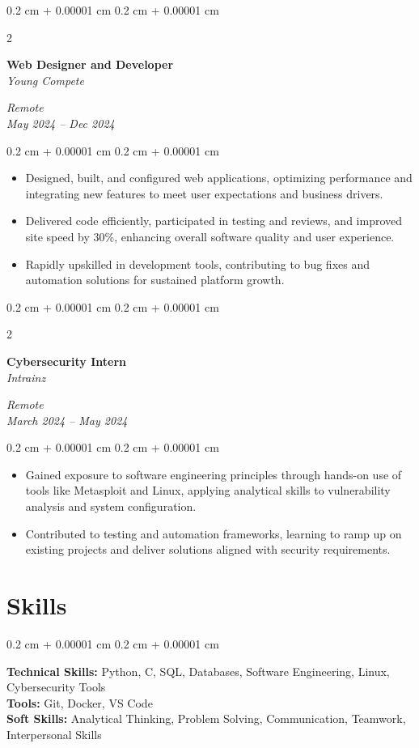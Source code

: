 \documentclass[10pt, letterpaper]{article}
\newenvironment{highlights}{
    \begin{itemize}[
        topsep=0.10 cm,
        parsep=0.10 cm,
        partopsep=0pt,
        itemsep=0pt,
        leftmargin=0.4 cm + 10pt
    ]
}{
    \end{itemize}
} %
\newenvironment{onecolentry}{
    \begin{adjustwidth}{
        0.2 cm + 0.00001 cm
    }{
        0.2 cm + 0.00001 cm
    }
}{
    \end{adjustwidth}
} %
\newenvironment{twocolentry}[2][]{
    \onecolentry
    \def\secondColumn{#2}
    \setcolumnwidth{\fill, 4.5 cm}
    \begin{paracol}{2}
}{
    \switchcolumn \raggedleft \secondColumn
    \end{paracol}
    \endonecolentry
} %
\begin{document}
    \vspace{0.2 cm}
    \begin{twocolentry}{
        \textit{Remote} \\
        \textit{May 2024 – Dec 2024}
    }
        \textbf{Web Designer and Developer} \\
        \textit{Young Compete}
    \end{twocolentry}
    \vspace{0.10 cm}
    \begin{onecolentry}
        \begin{highlights}
            \item Designed, built, and configured web applications, optimizing performance and integrating new features to meet user expectations and business drivers.
            \item Delivered code efficiently, participated in testing and reviews, and improved site speed by 30\%, enhancing overall software quality and user experience.
            \item Rapidly upskilled in development tools, contributing to bug fixes and automation solutions for sustained platform growth.
        \end{highlights}
    \end{onecolentry}

    \vspace{0.2 cm}
    \begin{twocolentry}{
        \textit{Remote} \\
        \textit{March 2024 – May 2024}
    }
        \textbf{Cybersecurity Intern} \\
        \textit{Intrainz}
    \end{twocolentry}
    \vspace{0.10 cm}
    \begin{onecolentry}
        \begin{highlights}
            \item Gained exposure to software engineering principles through hands-on use of tools like Metasploit and Linux, applying analytical skills to vulnerability analysis and system configuration.
            \item Contributed to testing and automation frameworks, learning to ramp up on existing projects and deliver solutions aligned with security requirements.
        \end{highlights}
    \end{onecolentry}

    \section{Skills}
    \begin{onecolentry}
        \textbf{Technical Skills:} Python, C, SQL, Databases, Software Engineering, Linux, Cybersecurity Tools \\
        \textbf{Tools:} Git, Docker, VS Code \\
        \textbf{Soft Skills:} Analytical Thinking, Problem Solving, Communication, Teamwork, Interpersonal Skills
    \end{onecolentry}
\end{document}

